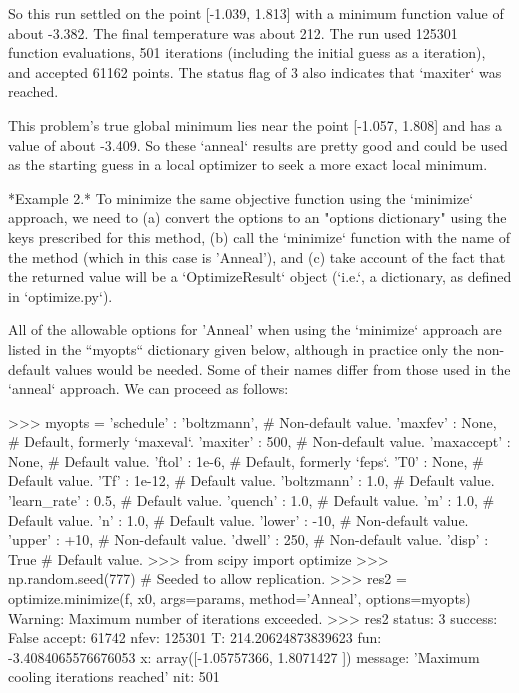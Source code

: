 \begin{DoxyVerb}
So this run settled on the point [-1.039, 1.813] with a minimum function
value of about -3.382.  The final temperature was about 212. The run used
125301 function evaluations, 501 iterations (including the initial guess as
a iteration), and accepted 61162 points. The status flag of 3 also
indicates that `maxiter` was reached.

This problem's true global minimum lies near the point [-1.057, 1.808]
and has a value of about -3.409.  So these `anneal` results are pretty
good and could be used as the starting guess in a local optimizer to
seek a more exact local minimum.

*Example 2.* To minimize the same objective function using
the `minimize` approach, we need to (a) convert the options to an
"options dictionary" using the keys prescribed for this method,
(b) call the `minimize` function with the name of the method (which
in this case is 'Anneal'), and (c) take account of the fact that
the returned value will be a `OptimizeResult` object (`i.e.`, a dictionary,
as defined in `optimize.py`).

All of the allowable options for 'Anneal' when using the `minimize`
approach are listed in the ``myopts`` dictionary given below, although
in practice only the non-default values would be needed.  Some of their
names differ from those used in the `anneal` approach.  We can proceed
as follows:

>>> myopts = {
        'schedule'     : 'boltzmann',   # Non-default value.
        'maxfev'       : None,  # Default, formerly `maxeval`.
        'maxiter'      : 500,   # Non-default value.
        'maxaccept'    : None,  # Default value.
        'ftol'         : 1e-6,  # Default, formerly `feps`.
        'T0'           : None,  # Default value.
        'Tf'           : 1e-12, # Default value.
        'boltzmann'    : 1.0,   # Default value.
        'learn_rate'   : 0.5,   # Default value.
        'quench'       : 1.0,   # Default value.
        'm'            : 1.0,   # Default value.
        'n'            : 1.0,   # Default value.
        'lower'        : -10,   # Non-default value.
        'upper'        : +10,   # Non-default value.
        'dwell'        : 250,   # Non-default value.
        'disp'         : True   # Default value.
        }
>>> from scipy import optimize
>>> np.random.seed(777)  # Seeded to allow replication.
>>> res2 = optimize.minimize(f, x0, args=params, method='Anneal',
                             options=myopts)
Warning: Maximum number of iterations exceeded.
>>> res2
  status: 3
 success: False
  accept: 61742
    nfev: 125301
       T: 214.20624873839623
     fun: -3.4084065576676053
       x: array([-1.05757366,  1.8071427 ])
 message: 'Maximum cooling iterations reached'
 nit: 501\end{DoxyVerb}
 

